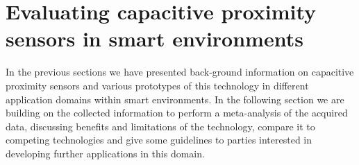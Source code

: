 \chapter{Evaluating capacitive proximity sensors in smart environments}
\label{ch:eval}
In the previous sections we have presented back-ground information on capacitive proximity sensors and various prototypes of this technology in different application domains within smart environments. In the following section we are building on the collected information to perform a meta-analysis of the acquired data, discussing benefits and limitations of the technology, compare it to competing technologies and give some guidelines to parties interested in developing further applications in this domain. 




